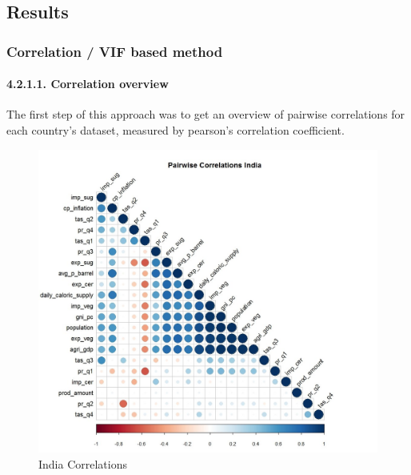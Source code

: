 \documentclass[11pt]{article}
\begin{document}
\subsection{Results}

\subsubsection{Correlation / VIF based method}

\paragraph{4.2.1.1. Correlation overview}
The first step of this approach was to get an overview of pairwise correlations for each country’s dataset, measured by pearson’s correlation coefficient.

\FloatBarrier
\begin{figure}[!htb]
\begin{center}
\includegraphics[scale=0.5]{R1.jpg}
\caption{India Correlations}
\label{figure6}
\end{center}
\end{figure}
\FloatBarrier
\end{document}
